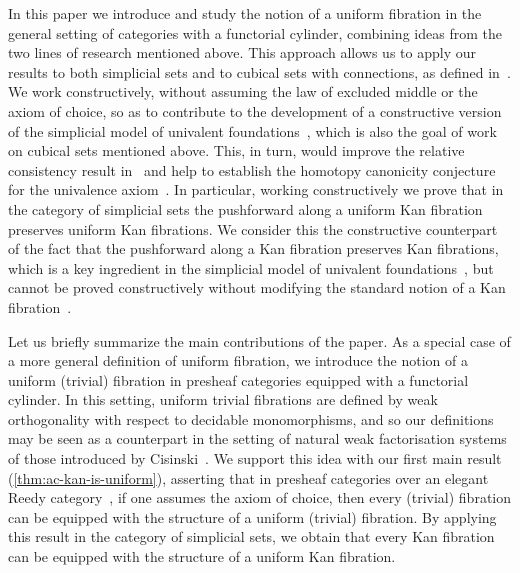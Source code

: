 \documentclass[reqno,10pt,a4paper,oneside]{amsart}
\begin{document}
In this paper we introduce and study the notion of a uniform fibration in the general setting of categories with a functorial cylinder, combining ideas from the two lines of research mentioned above.
This approach allows us to apply our results to both simplicial sets and to cubical sets with connections, as defined in~\cite{coquand-variation}.
We work constructively, \ie without assuming the law of excluded middle or the axiom of choice, so as to contribute to the development of a constructive version of the simplicial model of univalent foundations~\cite{voevodsky-simplicial-model}, which is also the goal of work on cubical sets mentioned above.
This, in turn, would improve the relative consistency result in~\cite[Theorem~3.4.3]{voevodsky-simplicial-model} and help to establish the homotopy canonicity conjecture for the univalence axiom~\cite{voevodsky:uf}.
In particular, working constructively we prove that in the category of simplicial sets the pushforward along a uniform Kan fibration preserves uniform Kan fibrations.
We consider this the constructive counterpart of the fact that the pushforward along a Kan fibration preserves Kan fibrations, which is a key ingredient in the simplicial model of univalent foundations~\cite[Lemma~2.3.1]{voevodsky-simplicial-model}, but cannot be proved constructively without modifying the standard notion of a Kan fibration~\cite{coquand-non-constructivity-kan}.

Let us briefly summarize the main contributions of the paper.
As a special case of a more general definition of uniform fibration, we introduce the notion of a uniform (trivial) fibration in presheaf categories equipped with a functorial cylinder.
In this setting, uniform trivial fibrations are defined by weak orthogonality with respect to decidable monomorphisms, and so our definitions may be seen as a counterpart in the setting of natural weak factorisation systems of those introduced by Cisinski~\cite{cisinski-asterisque}.
We support this idea with our first main result (\cref{thm:ac-kan-is-uniform}), asserting that in presheaf categories over an elegant Reedy category~\cite{bergner-rezk-elegant}, if one assumes the axiom of choice, then every (trivial) fibration can be equipped with the structure of a uniform (trivial) fibration.
By applying this result in the category of simplicial sets, we obtain that every Kan fibration can be equipped with the structure of a uniform Kan fibration.
\end{document}
